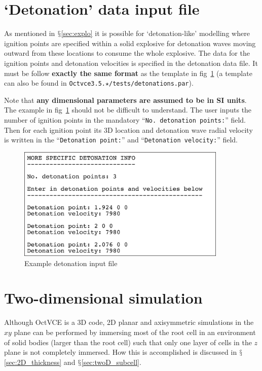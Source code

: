 \documentclass[pdftex, 12pt, a4paper]{report}
\begin{document}
\section{`Detonation' data input file}\label{sec:deton}

As mentioned in $\mathsection$\ref{sec:explo} it is possible for `detonation-like' modelling where ignition points are specified
within a solid explosive for detonation waves moving outward from these locations to consume the whole explosive.  The data for the 
ignition points and detonation velocities is specified in the detonation data file.  It must be follow \textbf{exactly the same format}
as the template in fig~\ref{fig:detonations.par} (a template can also be found in \verb'Octvce3.5.'$\star$\verb'/tests/detonations.par').

Note that \textbf{any dimensional parameters are assumed to be in SI units}.  The example in fig~\ref{fig:detonations.par} should not be
difficult to understand.  The user inputs the number of ignition points in the mandatory ``\verb'No. detonation points:''' field.
Then for each ignition point its 3D location and detonation wave radial velocity is written in the
``\verb'Detonation point:''' and ``\verb'Detonation velocity:''' field.

\begin{figure}[htp]
\centering
\includegraphics[width=10cm]{pics/deton_template.jpg}
\caption{Example detonation input file}
\label{fig:detonations.par}
\end{figure}

\section{Two-dimensional simulation}\label{sec:2D}

Although OctVCE is a 3D code, 2D planar and axisymmetric simulations in the $xy$ plane can be performed by immersing most of the root cell
in an environment of solid bodies (larger than the root cell) such that only one layer of cells in the $z$ plane is not completely
immersed.  How this is accomplished is discussed in $\mathsection$\ref{sec:2D_thickness} and
$\mathsection$\ref{sec:twoD_subcell}.
\end{document}
